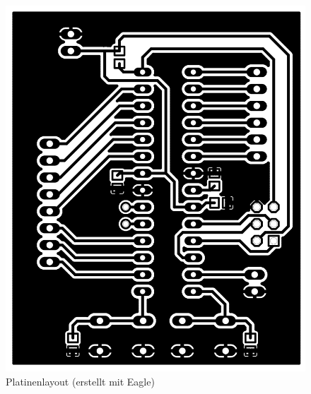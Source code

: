 \begin{figure}[t]
  \centering
  \includegraphics[angle=90, width=0.5\linewidth, keepaspectratio]{Bilder/DIYBoard}
  \caption{Platinenlayout (erstellt mit Eagle)}
  \label{board}
\end{figure}